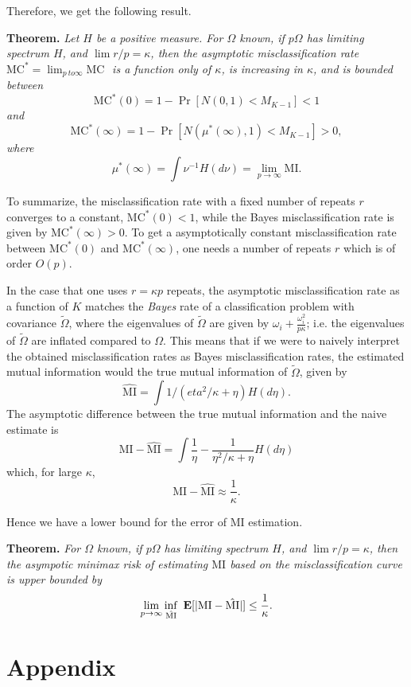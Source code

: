 \documentclass[12pt]{article}
\begin{document}
Therefore, we get the following result.

\textbf{Theorem. }\emph{
Let $H$ be a positive measure.
For $\Omega$ known, if $p\Omega$ has limiting spectrum $H$, and $\lim r/p = \kappa$, then
the asymptotic misclassification rate $\text{MC}^* = \lim_{p\ to \infty} \text{MC }$ is a function only of $\kappa$,
is increasing in $\kappa$,
and is bounded between
\[
\text{MC}^*(0) = 1 - \Pr[N(0, 1) < M_{K-1}] < 1
\]
and
\[
\text{MC}^*(\infty) = 1-\Pr[N(\mu^*(\infty), 1) < M_{K-1}] > 0,
\]
where
\[
\mu^*(\infty) = \int \nu^{-1} H(d\nu) = \lim_{p\to \infty} \text{MI}.
\]
}

To summarize, the misclassification rate with a fixed number of
repeats $r$ converges to a constant, $\text{MC}^*(0) < 1$, while the
Bayes misclassification rate is given by $\text{MC}^*(\infty) > 0$.
To get a asymptotically constant misclassification rate between
$\text{MC}^*(0)$ and $\text{MC}^*(\infty)$, one needs a number of
repeats $r$ which is of order $O(p)$.

In the case that one uses $r = \kappa p$ repeats, the asymptotic
misclassification rate as a function of $K$ matches the \emph{Bayes}
rate of a classification problem with covariance $\tilde{\Omega}$,
where the eigenvalues of $\tilde{\Omega}$ are given by $\omega_i
+ \frac{\omega_i^2}{p\kappa}$; i.e. the eigenvalues of
$\tilde{\Omega}$ are inflated compared to $\Omega$.  This means that
if we were to naively interpret the obtained misclassification rates
as Bayes misclassification rates, the estimated mutual information
would the true mutual information of $\tilde{\Omega}$, given by
\[
\hat{\text{MI}} = 
\int 1/(eta^2/\kappa + \eta) H(d\eta).\]
The asymptotic difference between the true mutual information and the naive estimate is
\[
\text{MI} - \hat{\text{MI}} = \int \frac{1}{\eta} - \frac{1}{\eta^2/\kappa + \eta}H(d\eta)
\]
which, for large $\kappa$,
\[
\text{MI} - \hat{\text{MI}} \approx \frac{1}{\kappa}.
\]

Hence we have a lower bound for the error of MI estimation.

\textbf{Theorem. }
\emph{
For $\Omega$ known, if $p\Omega$ has limiting spectrum $H$, and $\lim r/p = \kappa$, then
the asympotic minimax risk of estimating $\text{MI}$ based on the misclassification curve is upper bounded by}
\[
\lim_{p \to \infty} \inf_{\hat{\text{MI}}}\ \E[|\text{MI} - \hat{\text{MI}}|] \leq \frac{1}{\kappa}.
\]

\section{Appendix}
\end{document}
